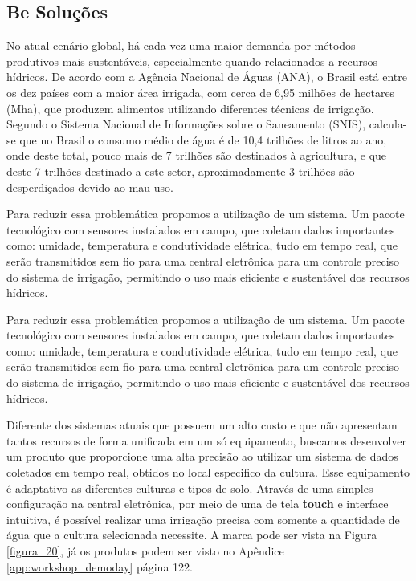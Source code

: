 \subsection{Be Soluções}

No atual cenário global, há cada vez uma maior demanda por métodos produtivos mais sustentáveis, especialmente quando relacionados a recursos hídricos. De acordo com a Agência Nacional de Águas (ANA), o Brasil está entre os dez países com a maior área irrigada, com cerca de 6,95 milhões de hectares (Mha), que produzem alimentos utilizando diferentes técnicas de irrigação. Segundo o Sistema Nacional de Informações sobre o Saneamento (SNIS), calcula-se que no Brasil o consumo médio de água é de 10,4 trilhões de litros ao ano, onde deste total, pouco mais de 7 trilhões são destinados à agricultura, e que deste 7 trilhões destinado a este setor, aproximadamente 3 trilhões são desperdiçados devido ao mau uso.

Para reduzir essa problemática propomos a utilização de um sistema. Um pacote tecnológico com sensores instalados em campo, que coletam dados importantes como: umidade, temperatura e condutividade elétrica, tudo em tempo real, que serão transmitidos sem fio para uma central eletrônica para um controle preciso do sistema
de irrigação, permitindo o uso mais eficiente e sustentável dos recursos hídricos.

Para reduzir essa problemática propomos a utilização de um sistema. Um pacote tecnológico com sensores instalados em campo, que coletam dados importantes como: umidade, temperatura e condutividade elétrica, tudo em tempo real, que serão transmitidos sem fio para uma central eletrônica para um controle preciso do sistema de irrigação, permitindo o uso mais eficiente e sustentável dos recursos hídricos.

Diferente dos sistemas atuais que possuem um alto custo e que não apresentam tantos recursos de forma unificada em um só equipamento, buscamos desenvolver um produto que proporcione uma alta precisão ao utilizar um sistema de dados coletados em tempo real, obtidos no local especifico da cultura. Esse equipamento é adaptativo as diferentes culturas e tipos de solo. Através de uma simples configuração na central eletrônica, por meio de uma de tela \textbf{touch} e interface intuitiva, é possível realizar uma irrigação precisa com somente a quantidade de água que a cultura selecionada necessite. A marca pode ser vista na Figura \ref{figura_20}, já os produtos podem ser visto no Apêndice \ref{app:workshop_demoday} página 122.

